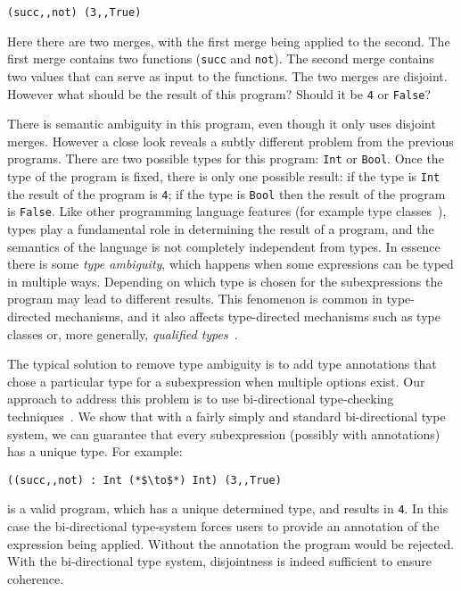 \begin{lstlisting}
(succ,,not) (3,,True)
\end{lstlisting}

\noindent Here there are two merges, with the first merge being applied to the second. 
The first merge contains two functions 
(\lstinline$succ$ and \lstinline$not$). The second merge contains two values 
that can serve as input to the functions. The two merges are disjoint. 
However what should be the result of this program? Should it be 
\lstinline$4$ or \lstinline$False$? %

There is semantic ambiguity in this program, even though it only uses
disjoint merges. However a close look reveals 
a subtly different problem from the previous programs. There are two possible 
types for this program: \lstinline{Int} or \lstinline{Bool}. Once the type 
of the program is fixed, there is only one possible result: if the type is 
\lstinline$Int$ the result of the program is \lstinline$4$; if the type 
is \lstinline$Bool$ then the result of the program is \lstinline$False$. 
Like other programming language features (for example type classes~\cite{Wadler89ad-hoc}), 
types play a fundamental role in determining the result of a program, and the 
semantics of the language is not completely independent from types. 
In essence there is some \emph{type ambiguity}, which happens 
when some expressions can 
be typed in multiple ways. Depending on which type is chosen 
for the subexpressions the program may lead to different results. 
This fenomenon is common in type-directed mechanisms, and it also 
affects type-directed mechanisms such as type classes or, more
generally, \emph{qualified types}~\cite{Mark93coherence}.

The typical solution to remove type ambiguity is to add type
annotations that chose a particular type for a subexpression when
multiple options exist. Our approach to address this problem is to 
use bi-directional type-checking techniques~\cite{Pierce00local,Dunfield04tri}. We show that 
with a fairly simply and standard bi-directional type system, we can guarantee 
that every subexpression (possibly with annotations) has a unique
type. For example:

\begin{lstlisting}
((succ,,not) : Int (*$\to$*) Int) (3,,True)
\end{lstlisting}

\noindent is a valid \name program, which has a unique determined type, and results in
\lstinline$4$. In this case the bi-directional type-system 
forces users to provide an annotation of the expression being applied.
Without the annotation the program would be rejected. With the
bi-directional type system, disjointness is indeed sufficient to ensure coherence. 

